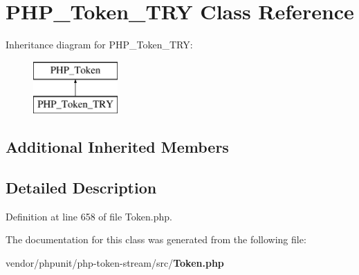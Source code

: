 \section{P\+H\+P\+\_\+\+Token\+\_\+\+T\+R\+Y Class Reference}
\label{class_p_h_p___token___t_r_y}
Inheritance diagram for P\+H\+P\+\_\+\+Token\+\_\+\+T\+R\+Y\+:\begin{figure}[H]
\begin{center}
\leavevmode
\includegraphics[height=2.000000cm]{class_p_h_p___token___t_r_y}
\end{center}
\end{figure}
\subsection*{Additional Inherited Members}


\subsection{Detailed Description}


Definition at line 658 of file Token.\+php.



The documentation for this class was generated from the following file\+:\begin{DoxyCompactItemize}
\item 
vendor/phpunit/php-\/token-\/stream/src/{\bf Token.\+php}\end{DoxyCompactItemize}
